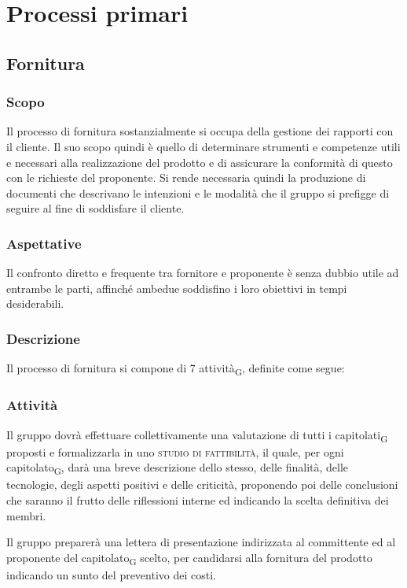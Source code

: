 \section{Processi primari}
\subsection{Fornitura}
    \subsubsection{Scopo}
        Il processo di fornitura sostanzialmente si occupa della gestione dei rapporti con il cliente.
        Il suo scopo quindi è quello di determinare strumenti e competenze utili e necessari alla realizzazione del prodotto e di assicurare la conformità di questo con le richieste del proponente. Si rende necessaria quindi la produzione di documenti che descrivano le intenzioni e le modalità che il gruppo si prefigge di seguire al fine di soddisfare il cliente.
    \subsubsection{Aspettative}
        Il confronto diretto e frequente tra fornitore e proponente è senza dubbio utile ad entrambe le parti, affinché ambedue soddisfino i loro obiettivi in tempi desiderabili.
    \subsubsection{Descrizione}
        Il processo di fornitura si compone  di 7 attività\textsubscript{G}, definite come segue:
    \subsubsection{Attività}
            Il gruppo dovrà effettuare collettivamente una valutazione di tutti i capitolati\textsubscript{G} proposti e formalizzarla in uno \textsc{studio di fattibilità}, il quale, per ogni capitolato\textsubscript{G}, darà una breve descrizione dello stesso, delle finalità, delle tecnologie, degli aspetti positivi e delle criticità, proponendo poi delle conclusioni che saranno il frutto delle riflessioni interne ed indicando la scelta definitiva dei membri.

            Il gruppo preparerà una lettera di presentazione indirizzata al committente ed al proponente del capitolato\textsubscript{G} scelto, per candidarsi alla fornitura del prodotto indicando un sunto del preventivo dei costi.

